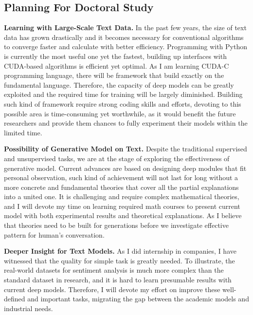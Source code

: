 \documentclass[16pt，letterpaper]{ctexart}
\begin{document}
\subsection{Planning For Doctoral Study}

\textbf{Learning with Large-Scale Text Data.}  In the past few years, the size of text data has grown drastically and it becomes necessary for conventional algorithms to converge faster and calculate with better efficiency. Programming with Python is currently the most useful one yet the fastest, building up interfaces with CUDA-based algorithms is efficient yet optimal. As I am learning CUDA-C programming language, there will be framework that build exactly on the fundamental language. Therefore, the capacity of deep models can be greatly exploited and the required time for training will be largely diminished. Building such kind of framework require strong coding skills and efforts, devoting to this possible area is time-consuming yet worthwhile, as it would benefit the future researchers and provide them chances to fully experiment their models within the limited time.

\textbf{Possibility of Generative Model on Text.} Despite the traditional supervised and unsupervised tasks, we are at the stage of exploring the effectiveness of generative model. Current advances are based on designing deep modules that fit personal observation, such kind of achievement will not last for long without a more concrete and fundamental theories that cover all the partial explanations into a united one. It is challenging and require complex mathematical theories, and I will devote my time on learning required math courses to present current model with both experimental results and theoretical explanations. As I believe that theories need to be built for generations before we investigate effective pattern for human's conversation.

\textbf{Deeper Insight for Text Models.} As I did internship in companies, I have witnessed that the quality for simple task is greatly needed. To illustrate, the real-world datasets for sentiment analysis is much more complex than the standard dataset in research, and it is hard to learn presumable results with current deep models. Therefore, I will devote my effort on improve these well-defined and important tasks, migrating the gap between the academic models and industrial needs.
\end{document}
